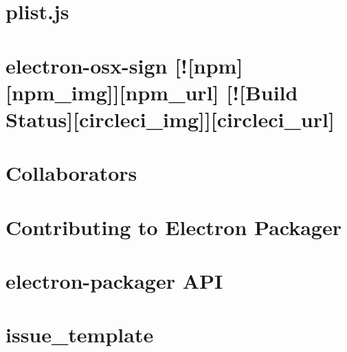 \documentclass[twoside]{book}
\newcommand{\+}{\discretionary{\mbox{\scriptsize$\hookleftarrow$}}{}{}}
\begin{document}
\chapter{plist.\+js}
\label{md_dsmacc_examples_DRmerge_node_modules_electron-osx-sign_node_modules_plist_README}

\chapter{electron-\/osx-\/sign \mbox{[}!\mbox{[}npm\mbox{]}\mbox{[}npm\+\_\+img\mbox{]}\mbox{]}\mbox{[}npm\+\_\+url\mbox{]} \mbox{[}!\mbox{[}Build Status\mbox{]}\mbox{[}circleci\+\_\+img\mbox{]}\mbox{]}\mbox{[}circleci\+\_\+url\mbox{]}}
\label{md_dsmacc_examples_DRmerge_node_modules_electron-osx-sign_README}

\chapter{Collaborators}
\label{md_dsmacc_examples_DRmerge_node_modules_electron-packager_collaborators}

\chapter{Contributing to Electron Packager}
\label{md_dsmacc_examples_DRmerge_node_modules_electron-packager_CONTRIBUTING}

\chapter{electron-\/packager A\+PI}
\label{md_dsmacc_examples_DRmerge_node_modules_electron-packager_docs_api}

\chapter{issue\+\_\+template}
\label{md_dsmacc_examples_DRmerge_node_modules_electron-packager_issue_template}

\end{document}
